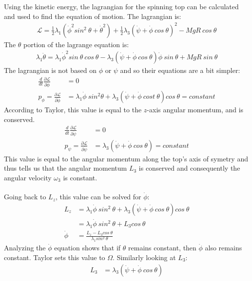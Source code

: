 \documentclass[a4paper,12pt]{article}
\begin{document}
Using the kinetic energy, the lagrangian for the spinning top can be calculated and used to find the equation of motion.  The lagrangian is:
\begin{align*}
\mathcal{L}=\frac{1}{2}\lambda_1(\dot\phi^2sin^2\ \theta+\dot\theta^2)+\frac{1}{2}\lambda_3(\dot\psi+\dot\phi\ cos\ \theta)^2-MgR\ cos\ \theta
\end{align*}
The $\theta$ portion of the lagrange equation is:
\begin{align*}
\lambda_1\ddot\theta=\lambda_1\dot\phi^2sin\ \theta\ cos\ \theta-\lambda_3(\dot\psi +\dot\phi\ cos\ \theta)\dot\phi\ sin\ \theta+MgR\ sin\ \theta
\end{align*}
The lagrangian is not based on $\phi$ or $\psi$ and so their equations are a bit simpler:
\begin{align*}
\frac{d}{dt}\frac{\partial\mathcal{L}}{\partial \dot\phi}&=0\\
p_\phi=\frac{\partial\mathcal{L}}{\partial \dot\phi}&=\lambda_1\dot\phi\ sin^2\theta+\lambda_3(\dot\psi+\dot\phi\ cost\ \theta)cos\ \theta=constant
\end{align*}
According to Taylor, this value is equal to the $z$-axis angular momentum, and is conserved.
\begin{align*}
\frac{d}{dt}\frac{\partial\mathcal{L}}{\partial \dot\psi}&=0\\
p_\psi=\frac{\partial\mathcal{L}}{\partial \dot\psi}&=\lambda_3(\dot\psi+\dot\phi\ cos\ \theta)=constant
\end{align*}
This value is equal to the angular momentum along the top's axis of symetry and thus tells us that the angular momentum $L_3$ is conserved and consequently the angular  velocity $\omega_3$ is constant.
\\
\\
Going back to $L_z$, this value can be solved for $\dot\phi$:
\begin{align*}
L_z&=\lambda_1\dot\phi\ sin^2\ \theta+\lambda_3(\dot\psi+\dot\phi\ cos\ \theta)cos\ \theta\\
&=\lambda_1\dot\phi\ sin^2\ \theta+L_3cos\ \theta\\
\dot\phi&=\frac{L_z-L_3cos\ \theta}{\lambda_1sin^2\ \theta}
\end{align*}
Analyzing the $\dot\phi$ equation shows that if $\theta$ remains constant, then $\dot\phi$ also remains constant.  Taylor sets this value to $\Omega$.  Similarly looking at $L_3$:
\begin{align*}
L_3&=\lambda_3(\dot\psi+\dot\phi\ cos\ \theta)
\end{align*}
\end{document}

